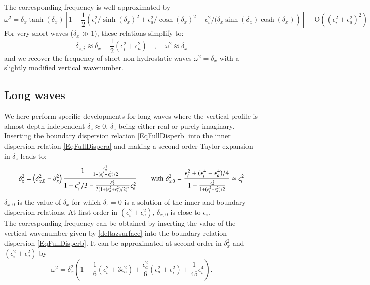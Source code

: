 \\
The corresponding frequency is well approximated by
\begin{equation}
\omega^2=\delta_x \tanh(\delta_x)
\left[1-\frac{1}{2}\left(
\epsilon_i^2/\sinh(\delta_x)^2+\epsilon_a^2/\cosh(\delta_x)^2-\epsilon_i^2/(\delta_x\sinh(\delta_x)\cosh(\delta_x)
\right)
\right]+\mathrm{O}	((\epsilon_i^2+\epsilon_a^2)^2)
\label{eqomegasurfacewaves}
\end{equation}
%
For very short waves ($\delta_x \gg 1$), these relations simplify to:
\[
\delta_{z,i}\approx \delta_x
-\frac{1}{2}\left(
\epsilon_i^2+\epsilon_a^2
\right)\quad
,\quad
\omega^2\approx \delta_x
\]
and we recover the frequency of short non hydrostatic waves $\omega^2 = \delta_x$ with a slightly modified vertical wavenumber.
%
%
\subsection{Long waves}
\label{SubSectionLongWavesrealdz}
We here perform specific developments for long waves where the vertical profile is almost depth-independent $\delta_z \approx 0$, $\delta_z$ being either real or purely imaginary.
Inserting the boundary dispersion relation \ref{EqFullDisperb} into the inner dispersion relation \ref{EqFullDispera} and making a second-order Taylor expansion in $\delta_z$ leads to:
\begin{equation}
	\delta_z^2=\left(
	\delta_{x,0}^2-\delta_x^2
	\right)
	\frac{1-\frac{\epsilon_a^2}{1+(\epsilon_i^2+\epsilon_a^2)/2}}{1+\epsilon_i^2/3-\frac{\delta_x^2}{3(1+(\epsilon_a^2+\epsilon_i^2)/2)^2}\epsilon_a^2}
\qquad\hbox{with }
\delta_{x,0}^2
=
\frac{\epsilon_i^2+(\epsilon_i^4-\epsilon_a^4)/4}{1-\frac{\epsilon_a^2}{1+(\epsilon_i^2+\epsilon_a^2)/2}}
\approx \epsilon_i^2
	\label{deltazsurface}
\end{equation}
%
$\delta_{x,0}$ is the value of $\delta_x$ for which $\delta_z=0$ is a solution of the inner and boundary dispersion relations. At first order in $(\epsilon_i^2+\epsilon_a^2)$, $\delta_{x,0}$ is close to $\epsilon_i$.\\
The corresponding frequency can be obtained by inserting the value of the vertical wavenumber given by \ref{deltazsurface} into the boundary relation dispersion \ref{EqFullDisperb}. It can be approximated at second order in $\delta_x^2$ and $(\epsilon_i^2+\epsilon_a^2)$ by
\begin{equation}
	\omega^2 = \delta_x^2 \left(
	1
	-\frac{1}{6}\left(
	\epsilon_i^2+3\epsilon_a^2
	\right)
	+\frac{\epsilon_a^2}{6}\left(\epsilon_a^2+\epsilon_i^2\right)+\frac{1}{45}\epsilon_i^4
	\right).
	\label{eqomegalongwavereal}
\end{equation}
%

